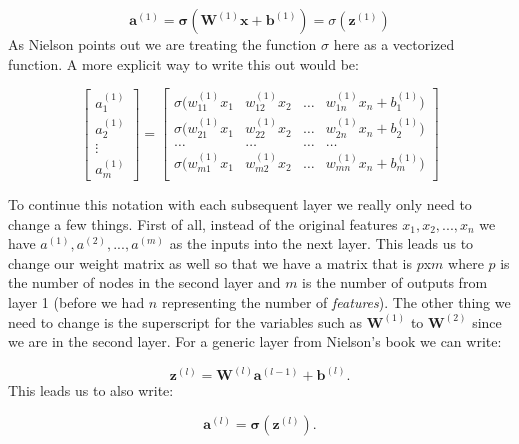 \begin{equation}
\mathbf{a}^{(1)} = \mathbf{\sigma}(\mathbf{W}^{(1)} \mathbf{x} + \mathbf{b}^{(1)}) = \sigma(\mathbf{z}^{(1)})
\end{equation}
\noindent As Nielson points out we are treating the function $\sigma$ here as a vectorized function. A more explicit way to write this out would be:

\[
\begin{bmatrix}
           a^{(1)}_{1} \\
           a^{(1)}_{2} \\
           \vdots \\
           a^{(1)}_{m}
         \end{bmatrix}
         =
\left[
  \begin{array}{cccc}
    \sigma(w^{(1)}_{11}x_1 & w^{(1)}_{12}x_2 & \hdots & w^{(1)}_{1n}x_n + b_1^{(1)}) \\
    \sigma(w^{(1)}_{21}x_1 & w^{(1)}_{22}x_2 & \hdots & w^{(1)}_{2n}x_n + b_2^{(1)} ) \\
    \hdots &  \hdots  & \hdots &  \hdots \\
    \sigma(w^{(1)}_{m1}x_1 & w^{(1)}_{m2}x_2 & \hdots & w^{(1)}_{mn}x_n + b_m^{(1)} ) \\ 
  \end{array}
\right]
\]

To continue this notation with each subsequent layer we really only need to change a few things. First of all, instead of the original features $x_1, x_2, ..., x_n$ we have $a^{(1)}, a^{(2)}, ..., a^{(m)}$ as the inputs into the next layer. This leads us to change our weight matrix as well so that we have a matrix that is $p$x$m$ where $p$ is the number of nodes in the second layer and $m$ is the number of outputs from layer 1 (before we had $n$ representing the number of \emph{features}). The other thing we need to change is the superscript for the variables such as $\mathbf{W}^{(1)}$ to $\mathbf{W}^{(2)}$ since we are in the second layer. For a generic layer from Nielson's book we can write:

\begin{equation}
\mathbf{z}^{(l)} = \mathbf{W}^{(l)} \mathbf{a}^{(l-1)} + \mathbf{b}^{(l)}.
\end{equation}
\noindent This leads us to also write:

\begin{equation}
\mathbf{a}^{(l)} = \mathbf{\sigma}(\mathbf{z}^{(l)}).
\end{equation}


